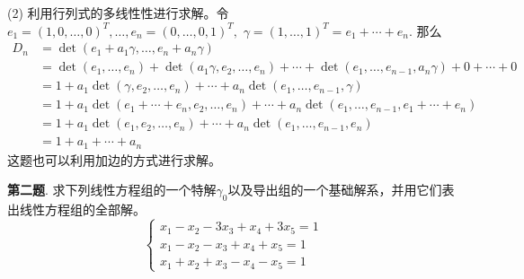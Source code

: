 (2) 利用行列式的多线性性进行求解。令$e_1 = (1, 0, \ldots, 0)^T, \ldots, e_n = (0, \ldots, 0, 1)^T,$ $\gamma = (1, \ldots, 1)^T = e_1 + \cdots + e_n.$ 那么
\begin{align*}
D_n & = \det( e_1 + a_1 \gamma, \ldots, e_n + a_n \gamma) \\
& = \det( e_1, \ldots, e_n) + \det( a_1 \gamma, e_2, \ldots, e_n) + \cdots + \det( e_1, \ldots, e_{n-1}, a_n \gamma) + 0 + \cdots + 0 \\
& = 1 + a_1 \det( \gamma, e_2, \ldots, e_n) + \cdots + a_n \det( e_1, \ldots, e_{n-1}, \gamma) \\
& = 1 + a_1 \det( e_1 + \cdots + e_n, e_2, \ldots, e_n) + \cdots + a_n \det( e_1, \ldots, e_{n-1}, e_1 + \cdots + e_n) \\
& = 1 + a_1 \det( e_1, e_2, \ldots, e_n) + \cdots + a_n \det( e_1, \ldots, e_{n-1}, e_n) \\
& = 1 + a_1 + \cdots + a_n
\end{align*}
这题也可以利用加边的方式进行求解。

\fi  %

\newpageorvspace

{\bf 第二题}. 求下列线性方程组的一个特解$\gamma_0$以及导出组的一个基础解系，并用它们表出线性方程组的全部解。
$$
\begin{cases}
x_1 - x_2 - 3 x_3 + x_4 + 3 x_5 = 1 \\
x_1 - x_2 - x_3 + x_4 + x_5 = 1 \\
x_1 + x_2 + x_3 - x_4 - x_5 = 1
\end{cases}
$$

\ifIncludeAnswer

\newpageorvspace

